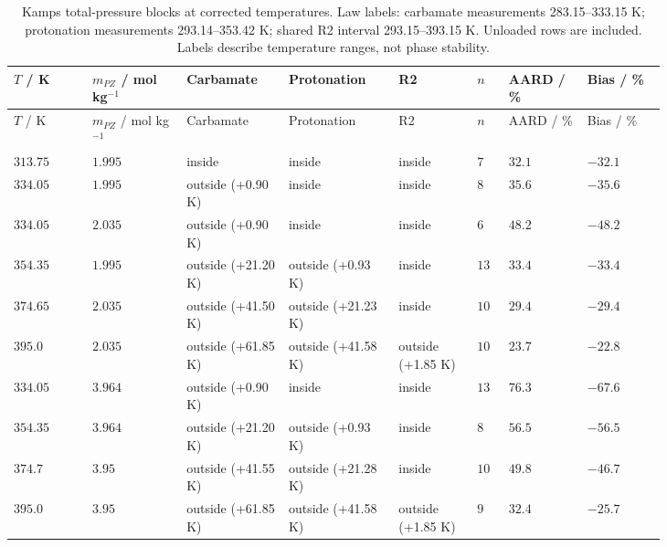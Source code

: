 \begin{longtable}{@{}>{\raggedright\arraybackslash}p{0.1\linewidth}>{\raggedright\arraybackslash}p{0.12\linewidth}>{\raggedright\arraybackslash}p{0.13\linewidth}>{\raggedright\arraybackslash}p{0.14\linewidth}>{\raggedright\arraybackslash}p{0.1\linewidth}>{\raggedright\arraybackslash}p{0.04\linewidth}>{\raggedright\arraybackslash}p{0.1\linewidth}>{\raggedright\arraybackslash}p{0.1\linewidth}@{}}
\caption{Kamps total-pressure blocks at corrected temperatures. Law labels: carbamate measurements 283.15--333.15 K; protonation measurements 293.14--353.42 K; shared R2 interval 293.15--393.15 K. Unloaded rows are included. Labels describe temperature ranges, not phase stability.}\label{tab:p2-kamps-blocks}\\
\toprule $T$ / K & $m_{PZ}$ / mol kg$^{-1}$ & Carbamate & Protonation & R2 & $n$ & AARD / \% & Bias / \% \\ \midrule\endfirsthead
\toprule $T$ / K & $m_{PZ}$ / mol kg$^{-1}$ & Carbamate & Protonation & R2 & $n$ & AARD / \% & Bias / \% \\ \midrule\endhead
\bottomrule\endfoot
$313.75$ & $1.995$ & inside & inside & inside & $7$ & $32.1$ & $-32.1$ \\
$334.05$ & $1.995$ & outside (+0.90 K) & inside & inside & $8$ & $35.6$ & $-35.6$ \\
$334.05$ & $2.035$ & outside (+0.90 K) & inside & inside & $6$ & $48.2$ & $-48.2$ \\
$354.35$ & $1.995$ & outside (+21.20 K) & outside (+0.93 K) & inside & $13$ & $33.4$ & $-33.4$ \\
$374.65$ & $2.035$ & outside (+41.50 K) & outside (+21.23 K) & inside & $10$ & $29.4$ & $-29.4$ \\
$395.0$ & $2.035$ & outside (+61.85 K) & outside (+41.58 K) & outside (+1.85 K) & $10$ & $23.7$ & $-22.8$ \\
$334.05$ & $3.964$ & outside (+0.90 K) & inside & inside & $13$ & $76.3$ & $-67.6$ \\
$354.35$ & $3.964$ & outside (+21.20 K) & outside (+0.93 K) & inside & $8$ & $56.5$ & $-56.5$ \\
$374.7$ & $3.95$ & outside (+41.55 K) & outside (+21.28 K) & inside & $10$ & $49.8$ & $-46.7$ \\
$395.0$ & $3.95$ & outside (+61.85 K) & outside (+41.58 K) & outside (+1.85 K) & $9$ & $32.4$ & $-25.7$ \\
\end{longtable}\endgroup
